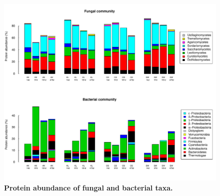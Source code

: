 \documentclass[10pt]{article}
\begin{document}
\begin{flushleft}
\newpage
\begin{figure}[h!]
\vspace*{2mm}
\begin{center}
\includegraphics{ligpaper-metaprot2}
\end{center}
\caption{
{\bf Protein abundance of fungal and bacterial taxa.}}
\label{fig:metaprot_barplot}
\end{figure}



\end{flushleft}
\end{document}
